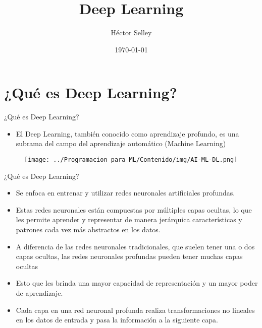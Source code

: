 \documentclass[11pt,aspectratio=169]{beamer}
\author{Héctor Selley}
\title{Deep Learning}
\institute{Universidad Anáhuac México}
\date{\today}
\begin{document}

\begin{frame}
	\titlepage
\end{frame}


\section{¿Qué es Deep Learning?}
\begin{frame}{¿Qué es Deep Learning?}
	\begin{itemize}
		\item El Deep Learning, también conocido como aprendizaje profundo, es una subrama del campo del aprendizaje automático (Machine Learning)\pause
	\end{itemize}
	\begin{figure}[H]
		\centering
		\texttt{[image: ../Programacion para ML/Contenido/img/AI-ML-DL.png]} %
	\end{figure}
\end{frame}

\begin{frame}{¿Qué es Deep Learning?}
	\begin{itemize}
		\item Se enfoca en entrenar y utilizar redes neuronales artificiales profundas.\pause 
		\item Estas redes neuronales están compuestas por múltiples capas ocultas, lo que les permite aprender y representar de manera jerárquica 
			características y patrones cada vez más abstractos en los datos.\pause
		\item A diferencia de las redes neuronales tradicionales, que suelen tener una o dos capas ocultas, las redes neuronales profundas pueden 
			tener muchas capas ocultas\pause 
		\item Esto que les brinda una mayor capacidad de representación y un mayor poder de aprendizaje. \pause 
		\item Cada capa en una red neuronal profunda realiza transformaciones no lineales en los datos de entrada y pasa la información 
			a la siguiente capa.
	\end{itemize}
\end{frame}
\end{document}
